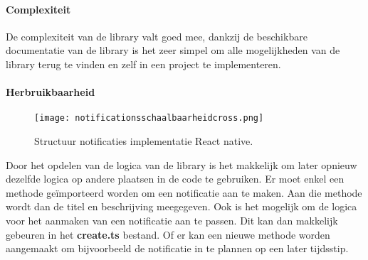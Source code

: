 \paragraph{Complexiteit}
De complexiteit van de library valt goed mee, dankzij de beschikbare documentatie van de library is het zeer 
simpel om alle mogelijkheden van de library terug te vinden en zelf in een project te implementeren. 

\paragraph{Herbruikbaarheid}
\begin{figure}[H]
    \centering
    \texttt{[image: notificationsschaalbaarheidcross.png]}
    \caption{Structuur notificaties implementatie React native.}
\end{figure}
Door het opdelen van de logica van de library is het makkelijk om later opnieuw dezelfde logica op andere plaatsen 
in de code te gebruiken. Er moet enkel een methode geïmporteerd worden om een notificatie aan te maken. Aan die methode 
wordt dan de titel en beschrijving meegegeven. Ook is het mogelijk om de logica voor het aanmaken van een notificatie 
aan te passen. Dit kan dan makkelijk gebeuren in het \textbf{create.ts} bestand. Of er kan een nieuwe methode worden 
aangemaakt om bijvoorbeeld de notificatie in te plannen op een later tijdsstip.